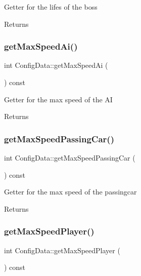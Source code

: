 Getter for the lifes of the boss \begin{DoxyReturn}{Returns}

\end{DoxyReturn}
\mbox{\label{classConfigData_ad9c86352ac8cabb3817eadf52dee0605}} 
\subsubsection{\texorpdfstring{get\+Max\+Speed\+Ai()}{getMaxSpeedAi()}}
{\footnotesize\ttfamily int Config\+Data\+::get\+Max\+Speed\+Ai (\begin{DoxyParamCaption}{ }\end{DoxyParamCaption}) const}

Getter for the max speed of the AI \begin{DoxyReturn}{Returns}

\end{DoxyReturn}
\mbox{\label{classConfigData_acc83f639f36dd93dee1f4bf2cf3cb374}} 
\subsubsection{\texorpdfstring{get\+Max\+Speed\+Passing\+Car()}{getMaxSpeedPassingCar()}}
{\footnotesize\ttfamily int Config\+Data\+::get\+Max\+Speed\+Passing\+Car (\begin{DoxyParamCaption}{ }\end{DoxyParamCaption}) const}

Getter for the max speed of the passingcar \begin{DoxyReturn}{Returns}

\end{DoxyReturn}
\mbox{\label{classConfigData_ab791ddf310f5dd0f0ed12752dcae18bc}} 
\subsubsection{\texorpdfstring{get\+Max\+Speed\+Player()}{getMaxSpeedPlayer()}}
{\footnotesize\ttfamily int Config\+Data\+::get\+Max\+Speed\+Player (\begin{DoxyParamCaption}{ }\end{DoxyParamCaption}) const}

